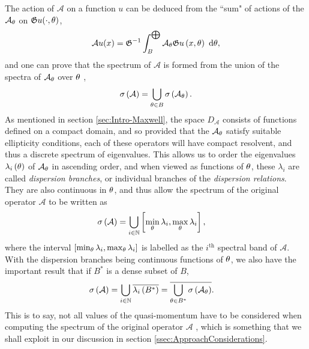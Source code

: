 The action of $\mathcal{A}$ on a function $u$ can be deduced from the ``sum" of actions of the $\mathcal{A}_{\theta}$ on $\mathfrak{G} u(\cdot,\theta)$,
\begin{align} \label{eq:GelfandDirectIntegral}
	\mathcal{A}u(x) = \mathfrak{G}^{-1}\int_{B}^{\bigoplus}\mathcal{A}_{\theta}\mathfrak{G} u\left( x,\theta \right) \ \mathrm{d}\theta,
\end{align}
and one can prove that the spectrum of $\mathcal{A}$ is formed from the union of the spectra of $\mathcal{A}_{\theta}$ over $\theta$ , 
\begin{align*}
	\sigma\left( \mathcal{A} \right) = \bigcup_{\theta\in B}\sigma\left( \mathcal{A}_{\theta} \right).
\end{align*}
As mentioned in section \ref{sec:Intro-Maxwell}, the space $D_{\mathcal{A}}$ consists of functions defined on a compact domain, and so provided that the $\mathcal{A}_{\theta}$ satisfy suitable ellipticity conditions, each of these operators will have compact resolvent, and thus a discrete spectrum of eigenvalues.
This allows us to order the eigenvalues $\lambda_i\left( \theta \right)$ of $\mathcal{A}_{\theta}$ in ascending order, and when viewed as functions of $\theta$, these $\lambda_i$ are called \emph{dispersion branches}, or individual branches of the \emph{dispersion relations}.
They are also continuous in $\theta$, and thus allow the spectrum of the original operator $\mathcal{A}$ to be written as
\begin{align*}
	\sigma\left( \mathcal{A} \right) &= \bigcup_{i\in\mathbb{N}}\left[  \min_{\theta}\lambda_i, \max_{\theta}\lambda_i  \right],
\end{align*}
where the interval $\left[  \min_{\theta}\lambda_i, \max_{\theta}\lambda_i  \right]$ is labelled as the $i^{\text{th}}$ spectral band of $\mathcal{A}$.
With the dispersion branches being continuous functions of $\theta$, we also have the important result that if $B^*$ is a dense subset of $B$,
\begin{align} \label{eq:TP-DenseQMSubsetSuffices}
	\sigma\left( \mathcal{A} \right) &= \bigcup_{i\in\mathbb{N}}\overline{\lambda_i\left( B^* \right)}
	= \overline{\bigcup_{\theta\in B^*}\sigma\left( \mathcal{A}_{\theta} \right)}.
\end{align}
This is to say, not all values of the quasi-momentum have to be considered when computing the spectrum of the original operator $\mathcal{A}$ , which is something that we shall exploit in our discussion in section \ref{ssec:ApproachConsiderations}.


